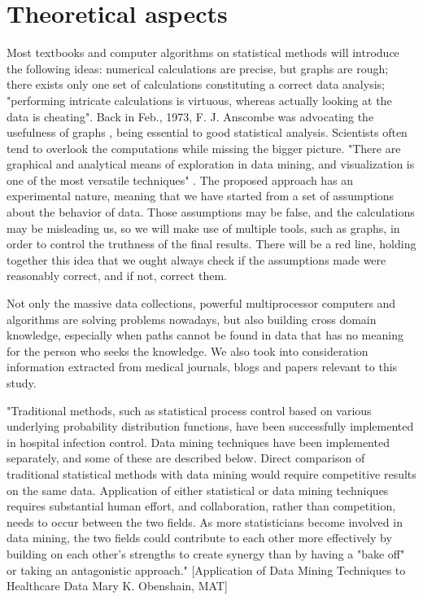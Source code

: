 \chapter{Theoretical aspects}
\pagestyle{fancy}
\label{relatedWork}
\lstset{style=mystyle}

Most textbooks and computer algorithms on statistical methods will introduce the following ideas: numerical calculations are precise, but graphs are rough; there exists only one set of calculations constituting a correct data analysis; "performing intricate calculations is virtuous, whereas actually looking at the data is cheating". Back in Feb., 1973, F. J. Anscombe was advocating the usefulness of graphs \cite{anscombe}, being essential to good statistical analysis. Scientists often tend to overlook the computations while missing the bigger picture. "There are graphical and analytical means of exploration in data mining, and visualization is one of the most versatile techniques" \cite{hoho}. The proposed approach has an experimental nature, meaning that we have started from a set of assumptions about the behavior of data. Those assumptions may be false, and the calculations may be misleading us, so we will make use of multiple tools, such as graphs, in order to control the truthness of the final results. There will be a red line, holding together this idea that we ought always check if the assumptions made were reasonably correct, and if not, correct them.

Not only the massive data collections, powerful multiprocessor computers and algorithms are solving problems nowadays, but also building cross domain knowledge, especially when paths cannot be found in data that has no meaning for the person who seeks the knowledge. We also took into consideration information extracted from medical journals, blogs and papers relevant to this study.

"Traditional methods, such as statistical process control based on various underlying probability distribution functions, have been successfully implemented in hospital infection control. Data mining techniques have been implemented separately, and some of these are described below. Direct comparison of traditional statistical methods with data mining would require competitive results on the same data. Application of either statistical or data mining techniques requires substantial human effort, and collaboration, rather than competition, needs to occur between the two fields. As more statisticians become involved in data mining, the two fields could contribute to each other more effectively by building on each other's strengths to create synergy than by having a "bake off" or taking an antagonistic approach." [Application of Data Mining Techniques to Healthcare Data Mary K. Obenshain, MAT]

